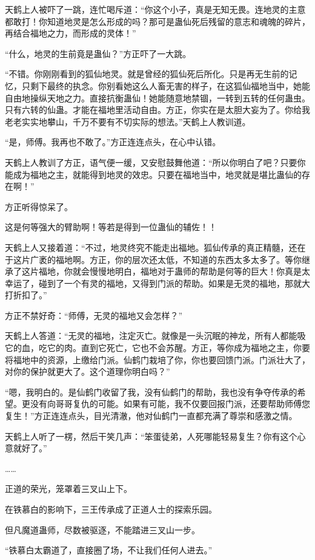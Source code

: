 \begin{this_body}
天鹤上人被吓了一跳，连忙喝斥道：“你这个小子，真是无知无畏。连地灵的主意都敢打！你知道地灵是怎么形成的吗？那可是蛊仙死后残留的意志和魂魄的碎片，再结合福地之力，而形成的灵体！”

“什么，地灵的生前竟是蛊仙？”方正吓了一大跳。

“不错。你刚刚看到的狐仙地灵。就是曾经的狐仙死后所化。只是再无生前的记忆，只剩下最终的执念。你别看她这么人畜无害的样子，在这狐仙福地当中，她能自由地操纵天地之力。直接抗衡蛊仙！她能随意地禁锢，一转到五转的任何蛊虫。只有六转的仙蛊。才能在福地里活动自由。方正，你实在是太胆大妄为了。你给我老老实实地攀山，千万不要有不切实际的想法。”天鹤上人教训道。

“是，师傅。我再也不敢了。”方正连连点头，在心中认错。

天鹤上人教训了方正，语气便一缓，又安慰鼓舞他道：“所以你明白了吧？只要你能成为福地之主，就能得到地灵的效忠。只要在福地当中，地灵就是堪比蛊仙的存在啊！”

方正听得惊呆了。

这是何等强大的臂助啊！等若是得到一位蛊仙的辅佐！！

天鹤上人又接着道：“不过，地灵终究不能走出福地。狐仙传承的真正精髓，还在于这片广袤的福地啊。方正，你的层次还太低，不知道的东西太多太多了。等你继承了这片福地，你就会慢慢地明白，福地对于蛊师的帮助是何等的巨大！你真是太幸运了，碰到了一个有灵的福地，又得到门派的帮助。如果是无灵的福地，那就大打折扣了。”

方正不禁好奇：“师傅，无灵的福地又会怎样？”

天鹤上人答道：“无灵的福地，注定灭亡。就像是一头沉眠的神龙，所有人都能吸它的血，吃它的肉。直到它死亡，它也不会苏醒。方正，等你成为福地之主，你要将福地中的资源，上缴给门派。仙鹤门栽培了你，你也要回馈门派。门派壮大了，对你的保护就更大了。这个道理你明白吗？”

“嗯，我明白的。是仙鹤门收留了我，没有仙鹤门的帮助，我也没有争夺传承的希望。更没有向哥哥复仇的可能。如果有可能，我不仅要回报门派，还要帮助师傅您复生！”方正连连点头，目光清澈，他对仙鹤门一直都充满了尊崇和感激之情。

天鹤上人听了一楞，然后干笑几声：“笨蛋徒弟，人死哪能轻易复生？你有这个心意就好了。”

……

正道的荣光，笼罩着三叉山上下。

在铁慕白的影响下，三王传承成了正道人士的探索乐园。

但凡魔道蛊师，尽数被驱逐，不能踏进三叉山一步。

“铁慕白太霸道了，直接圈了场，不让我们任何人进去。”


\end{this_body}
